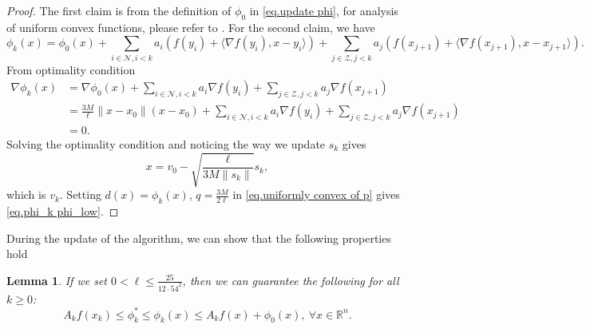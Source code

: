 \documentclass{article}
\theoremstyle{plain}
\newtheorem{lemma}[theorem]{Lemma}
\theoremstyle{definition}
\theoremstyle{remark}
\begin{document}
\begin{proof}
    The first claim is from the definition of $\phi_0$ in \eqref{eq.update phi}, for analysis of uniform convex functions, please refer to \citet[Section 4.2.2]{nesterov_lectures_2018}. For the second claim, we have
    \begin{equation}
        \label{eq.phi recursive}
        \phi_k(x) = \phi_0(x)+\sum_{i\in \mathcal{N},i<k}a_i\left (f(y_i)+\langle \nabla f(y_i),x-y_i\rangle \right)+\sum_{j\in \mathcal{Z},j<k}a_j\left (f(x_{j+1})+\langle \nabla f(x_{j+1}),x-x_{j+1}\rangle \right).
    \end{equation}
    From optimality condition
    \begin{equation*}
        \begin{aligned}
            \nabla \phi_k(x) & = \nabla \phi_0(x)+\sum_{i\in \mathcal{N},i<k}a_i\nabla f(y_i)+ \sum_{j\in \mathcal{Z},j<k}a_j\nabla f(x_{j+1})                \\
                             & = \frac{3M}{\ell}\|x-x_0\|(x-x_0)+\sum_{i\in \mathcal{N},i<k}a_i\nabla f(y_i)+ \sum_{j\in \mathcal{Z},j<k}a_j\nabla f(x_{j+1}) \\
                             & =0.
        \end{aligned}
    \end{equation*}
    Solving the optimality condition and noticing the way we update $s_k$ gives
    \begin{equation*}
        x = v_0 - \sqrt{\frac{\ell}{3M\|s_{k}\|}}s_{k},
    \end{equation*}
    which is $v_k$. Setting $d(x)=\phi_k(x)$, $q=\frac{3M}{2\ell}$ in \eqref{eq.uniformly convex of p} gives \eqref{eq.phi_k phi_low}.
\end{proof}
During the update of the algorithm, we can show that the following properties hold
\begin{lemma}\label{lem.estimate sequence}
    If we set $0<\ell \leq\frac{25}{12\cdot 54^2}$, then we can guarantee the following for all $k\geq 0$:
    \begin{equation}
        \label{eq.estimate sequence relation}
        A_k f(x_k)\leq \phi_k^*  \leq \phi_k(x)\leq A_k f(x)+\phi_0(x), \ \forall x\in \mathbb{R}^n.
    \end{equation}
\end{lemma}
\end{document}
